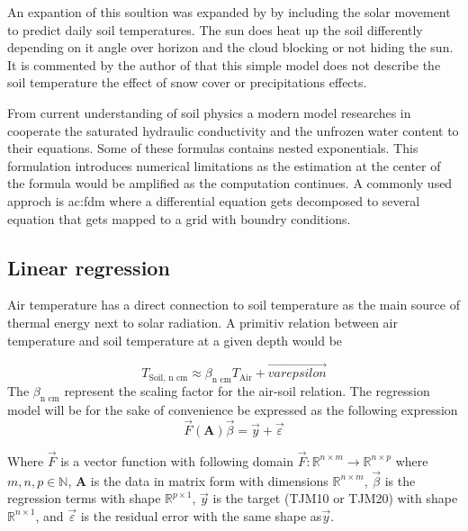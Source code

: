 An expantion of this soultion was expanded by \cite{roodenburg_estimating_1985} by including the solar movement to predict daily soil temperatures. The sun does heat up the soil differently depending on it angle over horizon and the cloud blocking or not hiding the sun. It is commented by the author of \cite{roodenburg_estimating_1985} that this simple model does not describe the soil temperature the effect of snow cover or precipitations effects.

From current understanding of soil physics a modern model researches in cooperate the saturated hydraulic conductivity and the unfrozen water content to their equations\cite{stuurop_influence_2022}. Some of these formulas contains nested exponentials\cite{stuurop_influence_2022}. This formulation introduces numerical limitations as the estimation at the center of the formula would be amplified as the computation continues. A commonly used approch is \acrfull{ac:fdm} where a differential equation gets decomposed to several equation that gets mapped to a grid with boundry conditions\cite{singh_numerical_2017,rankinen_simple_2004,cleall_analytical_2015}. 


\subsection{Linear regression}\label{sec:theory:linreg}
Air temperature has a direct connection to soil temperature as the main source of thermal energy next to solar radiation. A primitiv relation between air temperature and soil temperature at a given depth would be

\begin{equation}
	T_{\text{Soil, n cm}} \approx \beta_{\text{n cm}} T_{\text{Air}} + \vec{varepsilon}
\end{equation}
The $\beta_{\text{n cm}}$ represent the scaling factor for the air-soil relation. The regression model will be for the sake of convenience be expressed as the following expression
\begin{equation}
	\vec{F}(\mathbf{A})\vec{\beta}=\vec{y}+\vec{\varepsilon}
\end{equation}

Where $\vec{F}$ is a vector function with following domain $\vec{F}:\mathbb{R}^{n\times m}\to \mathbb{R}^{n\times p}$ where $m,n,p\in \mathbb{N}$, $\mathbf{A}$ is the data in matrix form with dimensions $\mathbb{R}^{n\times m}$, $\vec{\beta}$ is the regression terms with shape $\mathbb{R}^{p\times 1}$, $\vec{y}$ is the target (TJM10 or TJM20) with shape $\mathbb{R}^{n\times 1}$, and $\vec{\varepsilon}$ is the residual error with the same shape as$\vec{y}$.

